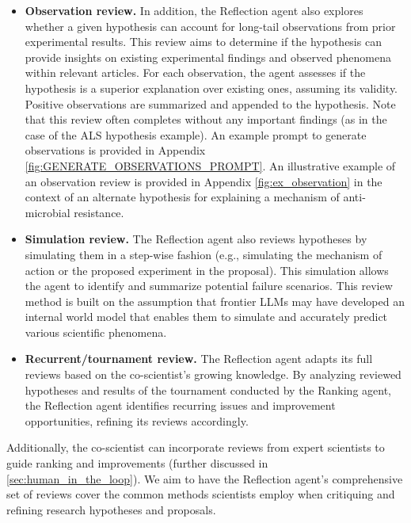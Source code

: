 \begin{itemize}
    \item \textbf{Observation review.} In addition, the Reflection agent also explores whether a given hypothesis can account for long-tail observations from prior experimental results. This review aims to determine if the hypothesis can provide insights on existing experimental findings and observed phenomena within relevant articles. For each observation, the agent assesses if the hypothesis is a superior explanation over existing ones, assuming its validity. Positive observations are summarized and appended to the hypothesis. Note that this review often completes without any important findings (as in the case of the ALS hypothesis example). An example prompt to generate observations is provided in Appendix \cref{fig:GENERATE_OBSERVATIONS_PROMPT}. An illustrative example of an observation review is provided in Appendix \cref{fig:ex_observation} in the context of an alternate hypothesis for explaining a mechanism of anti-microbial resistance.
    \item \textbf{Simulation review.} The Reflection agent also reviews hypotheses by simulating them in a step-wise fashion (e.g., simulating the mechanism of action or the proposed experiment in the proposal). This simulation allows the agent to identify and summarize potential failure scenarios. This review method is built on the assumption that frontier LLMs may have developed an internal world model that enables them to simulate and accurately predict various scientific phenomena. 
    \item \textbf{Recurrent/tournament review.} The Reflection agent adapts its full reviews based on the co-scientist's growing knowledge.  By analyzing reviewed hypotheses and results of the tournament conducted by the Ranking agent, 
    the Reflection agent identifies recurring issues and improvement opportunities, refining its reviews accordingly.
\end{itemize}

Additionally, the co-scientist can incorporate reviews from expert scientists to guide ranking and improvements (further discussed in \cref{sec:human_in_the_loop}). We aim to have the Reflection agent's comprehensive set of reviews cover the common methods scientists employ when critiquing and refining research hypotheses and proposals. 


